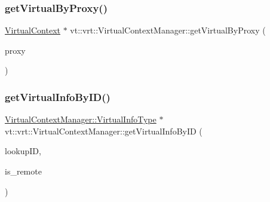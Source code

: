 \mbox{\label{structvt_1_1vrt_1_1_virtual_context_manager_a80a625ff7f7a4451fffd9f042a4caa5c}} 
\subsubsection{\texorpdfstring{get\+Virtual\+By\+Proxy()}{getVirtualByProxy()}}
{\footnotesize\ttfamily \hyperlink{structvt_1_1vrt_1_1_virtual_context}{Virtual\+Context} $\ast$ vt\+::vrt\+::\+Virtual\+Context\+Manager\+::get\+Virtual\+By\+Proxy (\begin{DoxyParamCaption}\item[{\hyperlink{namespacevt_a1b417dd5d684f045bb58a0ede70045ac}{Virtual\+Proxy\+Type} const \&}]{proxy }\end{DoxyParamCaption})}

\mbox{\label{structvt_1_1vrt_1_1_virtual_context_manager_aa05f4cec5679a32e0af06fc8283996e1}} 
\subsubsection{\texorpdfstring{get\+Virtual\+Info\+By\+I\+D()}{getVirtualInfoByID()}}
{\footnotesize\ttfamily \hyperlink{structvt_1_1vrt_1_1_virtual_context_manager_ad2cd828dbd8886166b4ceb3776c49239}{Virtual\+Context\+Manager\+::\+Virtual\+Info\+Type} $\ast$ vt\+::vrt\+::\+Virtual\+Context\+Manager\+::get\+Virtual\+Info\+By\+ID (\begin{DoxyParamCaption}\item[{\hyperlink{namespacevt_1_1vrt_a84d0891f52f70728c3fc2172cffb464b}{Virtual\+I\+D\+Type} const \&}]{lookup\+ID,  }\item[{bool const}]{is\+\_\+remote }\end{DoxyParamCaption})\hspace{0.3cm}{\ttfamily [private]}}

